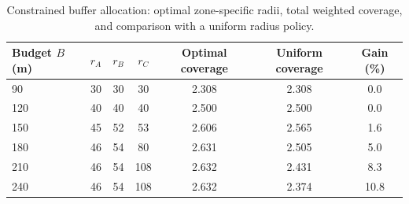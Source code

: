 \begin{table}[!ht]
\centering
\caption{Constrained buffer allocation: optimal zone-specific radii, total weighted coverage, and comparison with a uniform radius policy.}
\label{tab:p7opt}
\small
\begin{tabular}{lcccccc}
\toprule
Budget $B$ (m) & $r_A$ & $r_B$ & $r_C$ & Optimal coverage & Uniform coverage & Gain (\%) \\
\midrule
90 & 30 & 30 & 30 & 2.308 & 2.308 & 0.0 \\
120 & 40 & 40 & 40 & 2.500 & 2.500 & 0.0 \\
150 & 45 & 52 & 53 & 2.606 & 2.565 & 1.6 \\
180 & 46 & 54 & 80 & 2.631 & 2.505 & 5.0 \\
210 & 46 & 54 & 108 & 2.632 & 2.431 & 8.3 \\
240 & 46 & 54 & 108 & 2.632 & 2.374 & 10.8 \\
\bottomrule
\end{tabular}
\end{table}